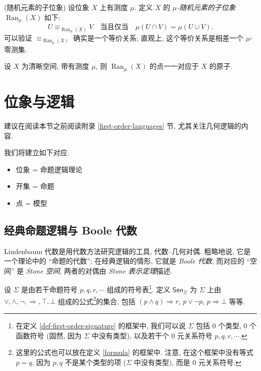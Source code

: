 \begin{propdef}
	{(随机元素的子位象)}
	设位象 $X$ 上有测度 $\mu$. 定义 $X$ 的 \emph{$\mu$-随机元素的子位象} $\operatorname{Ran}_\mu(X)$ 如下:
	$$
	U\equiv_{\operatorname{Ran}_\mu(X)} V \quad \text{当且仅当}\quad \mu(U\cap V) = \mu(U\cup V).
	$$
	可以验证 $\equiv_{\operatorname{Ran}_\mu(X)}$ 确实是一个等价关系; 直观上, 这个等价关系是相差一个 $\mu$-零测集.
\end{propdef}

\begin{prop}
	{}
	设 $X$ 为清晰空间, 带有测度 $\mu$, 则 $\operatorname{Ran}_\mu(X)$ 的点一一对应于 $X$ 的原子.
\end{prop}


\todo{}

\section{位象与逻辑}

\label{locales-and-logic}


建议在阅读本节之前阅读附录 \ref{first-order-languages} 节, 尤其关注几何逻辑的内容.


我们将建立如下对应.

\begin{itemize}
	\item 位象 = 命题逻辑理论
	\item 开集 = 命题
	\item 点 = 模型
\end{itemize}

\subsection{经典命题逻辑与 Boole 代数}

Lindenbaum 代数是用代数方法研究逻辑的工具, 代数--几何对偶. 粗略地说, 它是一个理论中的 ``命题的代数''; 在经典逻辑的情形, 它就是 \emph{Boole 代数}, 而对应的 ``空间'' 是 \emph{Stone 空间}, 两者的对偶由 \emph{Stone 表示定理}描述.

设 $\Sigma$ 是由若干命题符号 $p,q,r,\cdots$ 组成的符号表\footnote{在定义 \ref{def-first-order-signature} 的框架中, 我们可以说 $\Sigma$ 包括 $0$ 个类型, $0$ 个函数符号 (固然, 因为 $\Sigma$ 中没有类型), 以及若干个 $0$ 元关系符号 $p,q,r,\cdots$.}.
定义 $\mathsf {Sen}_\Sigma$ 为 $\Sigma$ 上由 $\lor,\land,\neg,\Rightarrow,\top,\bot$ 组成的公式\footnote{这里的公式也可以放在定义 \ref{formula} 的框架中. 注意, 在这个框架中没有等式 $p=q$, 因为 $p,q$ 不是某个类型的项 ($\Sigma$ 中没有类型), 而是 $0$ 元关系符号.}的集合, 包括 $(p\land q)\Rightarrow r$, $p\lor\neg p$, $p\Rightarrow\bot$ 等等.


